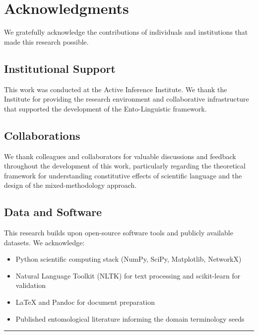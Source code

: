 \documentclass[
]{article}
\providecommand{\tightlist}{%
  \setlength{\itemsep}{0pt}\setlength{\parskip}{0pt}}
\numberwithin{equation}{section}
\begin{document}
\newpage

\section{Acknowledgments}\label{sec:acknowledgments}

We gratefully acknowledge the contributions of individuals and
institutions that made this research possible.

\subsection{Institutional Support}\label{institutional-support}

This work was conducted at the Active Inference Institute. We thank the
Institute for providing the research environment and collaborative
infrastructure that supported the development of the Ento-Linguistic
framework.

\subsection{Collaborations}\label{collaborations}

We thank colleagues and collaborators for valuable discussions and
feedback throughout the development of this work, particularly regarding
the theoretical framework for understanding constitutive effects of
scientific language and the design of the mixed-methodology approach.

\subsection{Data and Software}\label{data-and-software}

This research builds upon open-source software tools and publicly
available datasets. We acknowledge:

\begin{itemize}
\tightlist
\item
  Python scientific computing stack (NumPy, SciPy, Matplotlib, NetworkX)
\item
  Natural Language Toolkit (NLTK) for text processing and scikit-learn
  for validation
\item
  LaTeX and Pandoc for document preparation
\item
  Published entomological literature informing the domain terminology
  seeds
\end{itemize}

\begin{center}\rule{0.5\linewidth}{0.5pt}\end{center}
\end{document}
